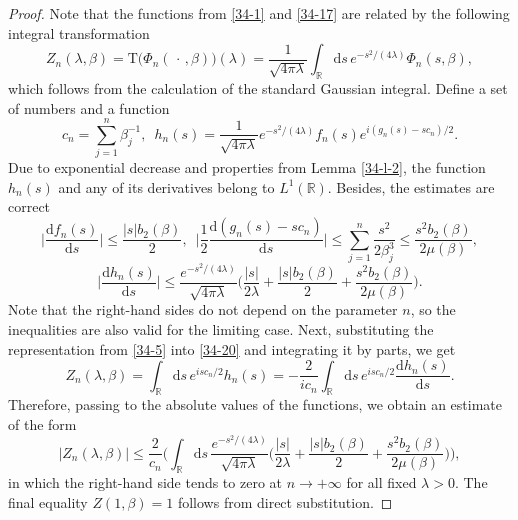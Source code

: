 \documentclass[a4paper]{article}
\begin{document}
\begin{proof} Note that the functions from \eqref{34-1} and \eqref{34-17} are related by the following integral transformation
\begin{equation}\label{34-20}
	Z_n(\lambda,\beta)=\mathrm{T}\big(\Phi_n(\,\cdot\,,\beta)\big)(\lambda)=
	\frac{1}{\sqrt{4\pi\lambda}}
	\int_{\mathbb{R}}\mathrm{d}s\,e^{-s^2/(4\lambda)}
	\Phi_n(s,\beta),
\end{equation}
which follows from the calculation of the standard Gaussian integral. Define a set of numbers and a function
\begin{equation}\label{34-23}
c_n=\sum_{j=1}^n\beta_j^{-1},\,\,\,h_n(s)=\frac{1}{\sqrt{4\pi\lambda}}e^{-s^2/(4\lambda)}
f_n(s)e^{i(g_n(s)-sc_n)/2}.
\end{equation}
Due to exponential decrease and properties from Lemma \ref{34-l-2}, the function $h_n(s)$ and any of its derivatives belong to $L^1(\mathbb{R})$. Besides, the estimates are correct
\begin{equation}\label{34-25}
\bigg|\frac{\mathrm{d}f_n(s)}{\mathrm{d}s}\bigg|\leqslant\frac{|s|b_2(\beta)}{2},\,\,\,
\bigg|\frac{1}{2}\frac{\mathrm{d}(g_n(s)-sc_n)}{\mathrm{d}s}\bigg|\leqslant
\sum_{j=1}^n\frac{s^2}{2\beta_j^3}\leqslant\frac{s^2b_2(\beta)}{2\mu(\beta)},
\end{equation}
\begin{equation}\label{34-24}
\bigg|\frac{\mathrm{d}h_n(s)}{\mathrm{d}s}\bigg|\leqslant
\frac{e^{-s^2/(4\lambda)}}{\sqrt{4\pi\lambda}}
\bigg(\frac{|s|}{2\lambda}+\frac{|s|b_2(\beta)}{2}+\frac{s^2b_2(\beta)}{2\mu(\beta)}\bigg).
\end{equation}
Note that the right-hand sides do not depend on the parameter $n$, so the inequalities are also valid for the limiting case.
Next, substituting the representation from \eqref{34-5} into \eqref{34-20} and integrating it by parts, we get
\begin{equation}\label{34-26}
Z_n(\lambda,\beta)=\int_{\mathbb{R}}\mathrm{d}s\,e^{isc_n/2}h_n(s)=-
\frac{2}{ic_n}\int_{\mathbb{R}}\mathrm{d}s\,e^{isc_n/2}\frac{\mathrm{d}h_n(s)}{\mathrm{d}s}.
\end{equation}
Therefore, passing to the absolute values of the functions, we obtain an estimate of the form
\begin{equation}\label{34-18}
|Z_n(\lambda,\beta)|\leqslant
\frac{2}{c_n}
\Bigg(
\int_{\mathbb{R}}\mathrm{d}s\,\frac{e^{-s^2/(4\lambda)}}{\sqrt{4\pi\lambda}}
\bigg(\frac{|s|}{2\lambda}+\frac{|s|b_2(\beta)}{2}+\frac{s^2b_2(\beta)}{2\mu(\beta)}\bigg)\Bigg),
\end{equation}
in which the right-hand side tends to zero at $n\to+\infty$ for all fixed $\lambda>0$. The final equality $Z(1,\beta)=1$ follows from direct substitution.
\end{proof}
\end{document}
